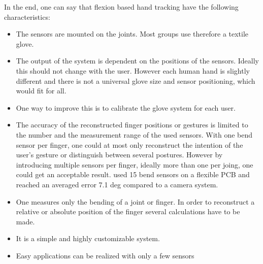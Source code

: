 In the end, one can say that flexion based hand tracking have the following characteristics:\\
\begin{itemize}
\item The sensors are mounted on the joints. Most groups use therefore a textile glove. 
\item The output of the system is dependent on the positions of the sensors. Ideally this should not change with the user. However each human hand is slightly different and there is not a universal glove size and sensor positioning, which would fit for all.
\item One way to improve this is to calibrate the glove system for each user.
\item The accuracy of the reconstructed finger positions or gestures is limited to the number and the measurement range of the used sensors. With one bend sensor per finger, one could at most only reconstruct the intention of the user's gesture or distinguish between several postures. However by introducing multiple sensors per finger, ideally more than one per joing, one could get an acceptable result. \cite{zecca2007development} used 15 bend sensors on a flexible PCB and reached an averaged error 7.1 deg  compared to a camera system.
\item One measures only the bending of a joint or finger. In order to reconstruct a relative or absolute position of the finger several calculations have to be made.
\item It is a simple and highly customizable system.
\item Easy applications can be realized with only a few sensors 
\end{itemize}


